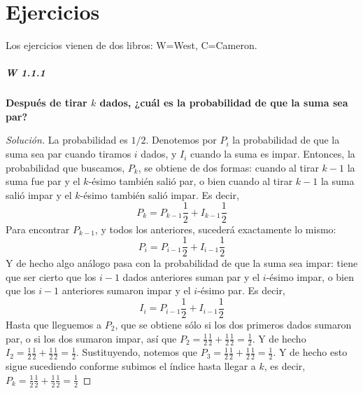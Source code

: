 \documentclass[spanish]{book}
\theoremstyle{definition}
\begin{document}
\chapter{Ejercicios}
Los ejercicios vienen de dos libros: W=West, C=Cameron.
\paragraph{W  1.1.1}\textbf{Después de tirar $k$ dados, ¿cuál es la probabilidad de que la suma sea par?}
\begin{proof}[Solución]
	La probabilidad es $1/2$. Denotemos por $P_i$ la probabilidad de que la suma sea par cuando tiramos $i$ dados, y $I_i$ cuando la suma es impar. Entonces, la probabilidad que buscamos, $P_k$, se obtiene de dos formas: cuando al tirar $k-1$ la suma fue par y el $k$-ésimo también salió par, o bien cuando al tirar $k-1$ la suma salió impar y el $k$-ésimo también salió impar. Es decir,
	\[P_k=P_{k-1}\frac{1}{2}+I_{k-1}\frac{1}{2}\]
	Para encontrar $P_{k-1}$, y todos los anteriores, sucederá exactamente lo mismo: \[P_i=P_{i-1}\frac{1}{2}+I_{i-1}\frac{1}{2}\]
	Y de hecho algo análogo pasa con la probabilidad de que la suma sea impar: tiene que ser cierto que los $i-1$ dados anteriores suman par y el $i$-ésimo impar, o bien que los $i-1$ anteriores sumaron impar y el $i$-ésimo par. Es decir, \[I_i=P_{i-1}\frac{1}{2}+I_{i-1}\frac{1}{2}\]
	Hasta que lleguemos a $P_2$, que se obtiene sólo si los dos primeros dados sumaron par, o si los dos sumaron impar, así que $P_2=\frac{1}{2}\frac{1}{2}+\frac{1}{2}\frac{1}{2}=\frac{1}{2}$. Y de hecho $I_2=\frac{1}{2}\frac{1}{2}+\frac{1}{2}\frac{1}{2}=\frac{1}{2}$. Sustituyendo, notemos que $P_3=\frac{1}{2}\frac{1}{2}+\frac{1}{2}\frac{1}{2}=\frac{1}{2}$. Y de hecho esto sigue sucediendo conforme subimos el índice hasta llegar a $k$, es decir, $P_k=\frac{1}{2}\frac{1}{2}+\frac{1}{2}\frac{1}{2}=\frac{1}{2}$
\end{proof}
\end{document}
